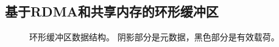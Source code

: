 \subsection{基于RDMA和共享内存的环形缓冲区}
\label{socksdirect:subsec:lockless-queue}

\begin{figure}[t]
	\centering
	\hspace{0.02\textwidth}
	
	\caption{环形缓冲区数据结构。 阴影部分是元数据，黑色部分是有效载荷。}
\end{figure}

